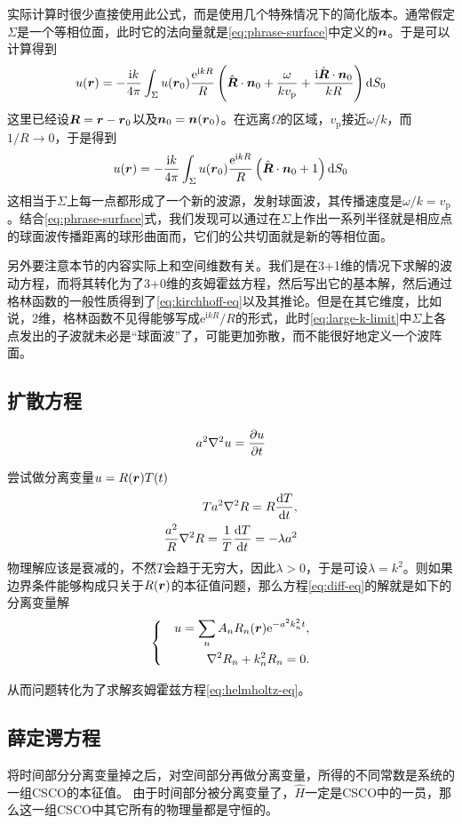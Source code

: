 \documentclass[UTF8]{ctexart}
\newenvironment{bigcase}{\left\{ \quad \begin{aligned}}{\end{aligned}\right.}
\newcommand*{\ii}{\mathrm{i}}
\newcommand*{\ee}{\mathrm{e}}
\begin{document}
实际计算时很少直接使用此公式，而是使用几个特殊情况下的简化版本。通常假定$\Sigma$是一个等相位面，此时它的法向量就是\eqref{eq:phrase-surface}中定义的$\vb*{n}$。于是可以计算得到
\begin{equation}
    u(\vb*{r}) = - \frac{\ii k}{4\pi} \int_\Sigma u(\vb*{r}_0) \frac{\ee^{\ii k R}}{R} \left( \hat{\vb*{R}} \cdot \vb*{n}_0 + \frac{\omega}{k v_\text{p}} + \frac{\ii \hat{\vb*{R}} \cdot \vb*{n}_0}{k R} \right) \dd{S_0}
\end{equation}
这里已经设$\vb*{R} = \vb*{r} - \vb*{r}_0$以及$\vb*{n}_0 = \vb*{n}(\vb*{r}_0)$。在远离$\Omega$的区域，$v_\text{p}$接近$\omega / k$，而$1/R \to 0$，于是得到
\begin{equation}
    u(\vb*{r}) = - \frac{\ii k}{4\pi} \int_\Sigma u(\vb*{r}_0) \frac{\ee^{\ii k R}}{R} \left( \hat{\vb*{R}} \cdot \vb*{n}_0 + 1 \right) \dd{S_0}
    \label{eq:large-k-limit}
\end{equation}
这相当于$\Sigma$上每一点都形成了一个新的波源，发射球面波，其传播速度是$\omega / k = v_\text{p}$。结合\eqref{eq:phrase-surface}式，我们发现可以通过在$\Sigma$上作出一系列半径就是相应点的球面波传播距离的球形曲面而，它们的公共切面就是新的等相位面。

另外要注意本节的内容实际上和空间维数有关。我们是在3+1维的情况下求解的波动方程，而将其转化为了3+0维的亥姆霍兹方程，然后写出它的基本解，然后通过格林函数的一般性质得到了\eqref{eq:kirchhoff-eq}以及其推论。但是在其它维度，比如说，2维，格林函数不见得能够写成$\ee^{\ii k R} / R$的形式，此时\eqref{eq:large-k-limit}中$\Sigma$上各点发出的子波就未必是“球面波”了，可能更加弥散，而不能很好地定义一个波阵面。

\subsection{扩散方程}

\begin{equation}
    a^2 \laplacian u = \pdv{u}{t}
    \label{eq:diff-eq}
\end{equation}

尝试做分离变量$u=R(\vb*{r}) T(t)$
\[
    \begin{split}
        T a^2 \laplacian R = R \dv{T}{t}, \\
        \frac{a^2}{R} \laplacian R = \frac{1}{T} \dv{T}{t} = -\lambda a^2
    \end{split}
\]
物理解应该是衰减的，不然$T$会趋于无穷大，因此$\lambda > 0$，于是可设$\lambda = k^2$。则如果边界条件能够构成只关于$R(\vb*{r})$的本征值问题，那么方程\eqref{eq:diff-eq}的解就是如下的分离变量解
\begin{equation}
    \begin{bigcase}
        u = \sum_n A_n R_n(\vb*{r}) \ee^{-a^2 k_n^2 t}, \\
        \laplacian R_n + k_n^2 R_n = 0.
    \end{bigcase}
\end{equation}

从而问题转化为了求解亥姆霍兹方程\eqref{eq:helmholtz-eq}。

\subsection{薛定谔方程}

将时间部分分离变量掉之后，对空间部分再做分离变量，所得的不同常数是系统的一组CSCO的本征值。
由于时间部分被分离变量了，$\hat{H}$一定是CSCO中的一员，那么这一组CSCO中其它所有的物理量都是守恒的。
\end{document}
